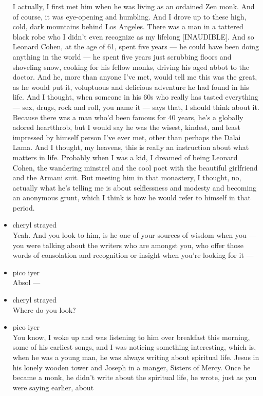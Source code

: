 \begin{itemize}
  I actually, I first met him when he was living as an ordained Zen
  monk. And of course, it was eye-opening and humbling. And I drove up
  to these high, cold, dark mountains behind Los Angeles. There was a
  man in a tattered black robe who I didn't even recognize as my
  lifelong {[}INAUDIBLE{]}. And so Leonard Cohen, at the age of 61,
  spent five years --- he could have been doing anything in the world
  --- he spent five years just scrubbing floors and shoveling snow,
  cooking for his fellow monks, driving his aged abbot to the doctor.
  And he, more than anyone I've met, would tell me this was the great,
  as he would put it, voluptuous and delicious adventure he had found in
  his life. And I thought, when someone in his 60s who really has tasted
  everything --- sex, drugs, rock and roll, you name it --- says that, I
  should think about it. Because there was a man who'd been famous for
  40 years, he's a globally adored heartthrob, but I would say he was
  the wisest, kindest, and least impressed by himself person I've ever
  met, other than perhaps the Dalai Lama. And I thought, my heavens,
  this is really an instruction about what matters in life. Probably
  when I was a kid, I dreamed of being Leonard Cohen, the wandering
  minstrel and the cool poet with the beautiful girlfriend and the
  Armani suit. But meeting him in that monastery, I thought, no,
  actually what he's telling me is about selflessness and modesty and
  becoming an anonymous grunt, which I think is how he would refer to
  himself in that period.
\item
  cheryl strayed\\
  Yeah. And you look to him, is he one of your sources of wisdom when
  you --- you were talking about the writers who are amongst you, who
  offer those words of consolation and recognition or insight when
  you're looking for it ---
\item
  pico iyer\\
  Absol ---
\item
  cheryl strayed\\
  Where do you look?
\item
  pico iyer\\
  You know, I woke up and was listening to him over breakfast this
  morning, some of his earliest songs, and I was noticing something
  interesting, which is, when he was a young man, he was always writing
  about spiritual life. Jesus in his lonely wooden tower and Joseph in a
  manger, Sisters of Mercy. Once he became a monk, he didn't write about
  the spiritual life, he wrote, just as you were saying earlier, about

\end{itemize}
